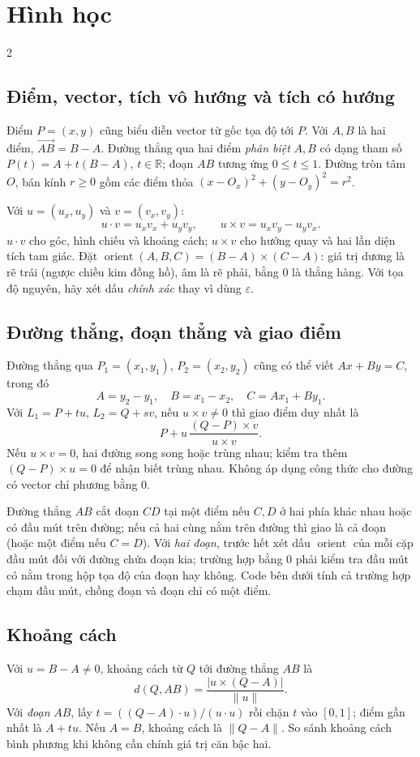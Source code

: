 \section{Hình học}
\begingroup\small
\begin{multicols}{2}

\subsection{Điểm, vector, tích vô hướng và tích có hướng}
Điểm $P=(x,y)$ cũng biểu diễn vector từ gốc tọa độ tới $P$.
Với $A,B$ là hai điểm, $\overrightarrow{AB}=B-A$.
Đường thẳng qua hai điểm \emph{phân biệt} $A,B$ có dạng tham số
$P(t)=A+t(B-A)$, $t\in\mathbb R$; đoạn $AB$ tương ứng
$0\leq t\leq1$. Đường tròn tâm $O$, bán kính $r\geq0$ gồm các
điểm thỏa $(x-O_x)^2+(y-O_y)^2=r^2$.

Với $u=(u_x,u_y)$ và $v=(v_x,v_y)$:
\[
u\cdot v=u_xv_x+u_yv_y,\qquad
u\times v=u_xv_y-u_yv_x.
\]
$u\cdot v$ cho góc, hình chiếu và khoảng cách;
$u\times v$ cho hướng quay và hai lần diện tích tam giác.
Đặt $\operatorname{orient}(A,B,C)=(B-A)\times(C-A)$:
giá trị dương là rẽ trái (ngược chiều kim đồng hồ), âm là rẽ phải,
bằng $0$ là thẳng hàng. Với tọa độ nguyên, hãy xét dấu \emph{chính xác}
thay vì dùng $\varepsilon$.

\subsection{Đường thẳng, đoạn thẳng và giao điểm}
Đường thẳng qua $P_1=(x_1,y_1)$, $P_2=(x_2,y_2)$ cũng có thể viết
$Ax+By=C$, trong đó
\[
A=y_2-y_1,\quad B=x_1-x_2,\quad C=Ax_1+By_1.
\]
Với $L_1=P+tu$, $L_2=Q+sv$, nếu $u\times v\ne0$ thì giao điểm duy
nhất là
\[
P+u\,\frac{(Q-P)\times v}{u\times v}.
\]
Nếu $u\times v=0$, hai đường song song hoặc trùng nhau; kiểm tra thêm
$(Q-P)\times u=0$ để nhận biết trùng nhau. Không áp dụng công thức
cho đường có vector chỉ phương bằng $0$.

Đường thẳng $AB$ cắt đoạn $CD$ tại một điểm nếu $C,D$ ở hai phía
khác nhau hoặc có đầu mút trên đường; nếu cả hai cùng nằm trên
đường thì giao là cả đoạn (hoặc một điểm nếu $C=D$). Với
\emph{hai đoạn}, trước hết xét dấu
$\operatorname{orient}$ của mỗi cặp đầu mút đối với đường chứa
đoạn kia; trường hợp bằng $0$ phải kiểm tra đầu mút có nằm trong
hộp tọa độ của đoạn hay không. Code bên dưới tính cả trường hợp
chạm đầu mút, chồng đoạn và đoạn chỉ có một điểm.

\subsection{Khoảng cách}
Với $u=B-A\ne0$, khoảng cách từ $Q$ tới đường thẳng $AB$ là
\[
d(Q,AB)=\frac{|u\times(Q-A)|}{\lVert u\rVert}.
\]
Với \emph{đoạn} $AB$, lấy $t=((Q-A)\cdot u)/(u\cdot u)$ rồi chặn
$t$ vào $[0,1]$; điểm gần nhất là $A+tu$. Nếu $A=B$, khoảng cách
là $\lVert Q-A\rVert$. So sánh khoảng cách bình phương khi không
cần chính giá trị căn bậc hai.


\end{multicols}
